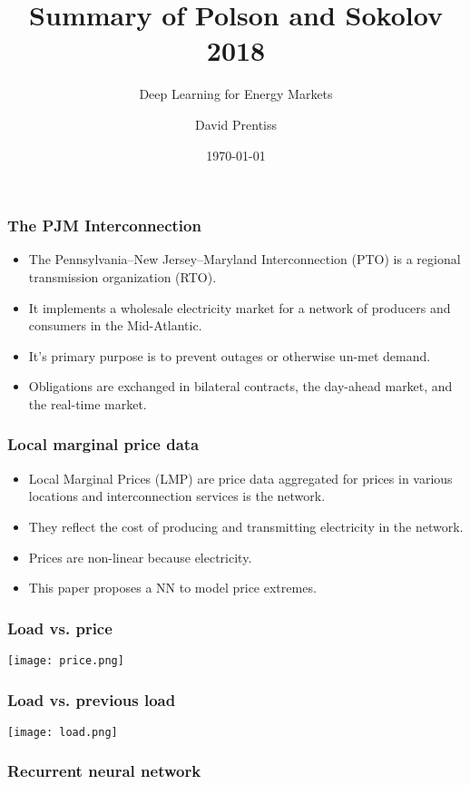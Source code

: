 \documentclass{beamer}
\begin{document}
\title{Summary of Polson and Sokolov 2018}
\subtitle{Deep Learning for Energy Markets}
\author{David Prentiss}
\date{\today}

\frame{\titlepage}

\begin{frame}
  \frametitle{The PJM Interconnection}
  \begin{itemize}
 \item The Pennsylvania--New Jersey--Maryland Interconnection (PTO) is a regional transmission organization (RTO).
    \item It implements a wholesale electricity market for a network of producers and consumers in the Mid-Atlantic.
      \item It's primary purpose is to prevent outages or otherwise un-met demand.
        \item Obligations are exchanged in bilateral contracts, the day-ahead market,
          and the real-time market.
  \end{itemize}
\end{frame}

\begin{frame}
  \frametitle{Local marginal price data}
  \begin{itemize}
  \item Local Marginal Prices (LMP) are price data aggregated for prices in various
  locations and interconnection services is the network.
  \item They reflect the cost of producing and transmitting electricity in the network.
    \item Prices are non-linear because electricity.
      \item This paper proposes a NN to model price extremes.
  \end{itemize}
\end{frame}

\begin{frame}
  \frametitle{Load vs. price}
  \texttt{[image: price.png]}
\end{frame}

\begin{frame}
  \frametitle{Load vs. previous load}
  \texttt{[image: load.png]}
\end{frame}

\begin{frame}
  \frametitle{Recurrent neural network}
\end{frame}
\end{document}
